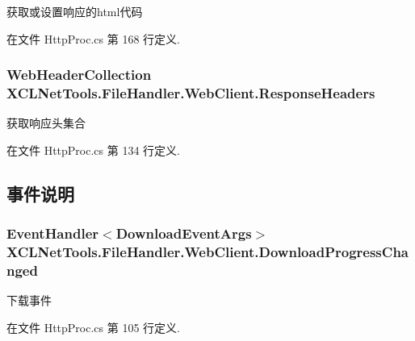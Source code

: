 获取或设置响应的html代码 



在文件 Http\-Proc.\-cs 第 168 行定义.

\hypertarget{class_x_c_l_net_tools_1_1_file_handler_1_1_web_client_a3d00d3457c23ce30274af963f4cab6bb}{
\subsubsection[{Response\-Headers}]{\setlength{\rightskip}{0pt plus 5cm}Web\-Header\-Collection X\-C\-L\-Net\-Tools.\-File\-Handler.\-Web\-Client.\-Response\-Headers\hspace{0.3cm}{\ttfamily [get]}}}\label{class_x_c_l_net_tools_1_1_file_handler_1_1_web_client_a3d00d3457c23ce30274af963f4cab6bb}


获取响应头集合 



在文件 Http\-Proc.\-cs 第 134 行定义.



\subsection{事件说明}
\hypertarget{class_x_c_l_net_tools_1_1_file_handler_1_1_web_client_aa1e50d608381b728356547eff9f80213}{
\subsubsection[{Download\-Progress\-Changed}]{\setlength{\rightskip}{0pt plus 5cm}Event\-Handler$<${\bf Download\-Event\-Args}$>$ X\-C\-L\-Net\-Tools.\-File\-Handler.\-Web\-Client.\-Download\-Progress\-Changed}}\label{class_x_c_l_net_tools_1_1_file_handler_1_1_web_client_aa1e50d608381b728356547eff9f80213}


下载事件 



在文件 Http\-Proc.\-cs 第 105 行定义.

